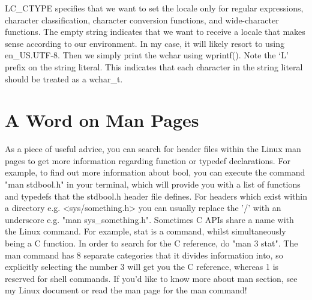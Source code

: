 \documentclass{article}
\begin{document}
LC\_CTYPE specifies that we want to set the locale only for regular expressions, character classification,
character conversion functions, and wide-character functions. The empty string indicates that we want to
receive a locale that makes sense according to our environment. In my case, it will likely resort to using
en\_US.UTF-8. Then we simply print the wchar using wprintf(). Note the ‘L’ prefix on the string literal. This
indicates that each character in the string literal should be treated as a wchar\_t.

\section{A Word on Man Pages}

As a piece of useful advice, you can search for header files within the Linux man pages to get more information
regarding function or typedef declarations. For example, to find out more information about bool, you can
execute the command "man stdbool.h" in your terminal, which will provide you with a list of functions and
typedefs that the stdbool.h header file defines. For headers which exist within a directory e.g.
<sys/something.h> you can usually replace the '/' with an underscore e.g. "man sys\_something.h". Sometimes C
APIs share a name with the Linux command. For example, stat is a command, whilst simultaneously being a C
function. In order to search for the C reference, do "man 3 stat". The man command has 8 separate categories
that it divides information into, so explicitly selecting the number 3 will get you the C reference, whereas 1
is reserved for shell commands. If you’d like to know more about man section, see my Linux document or read
the man page for the man command!
\end{document}
